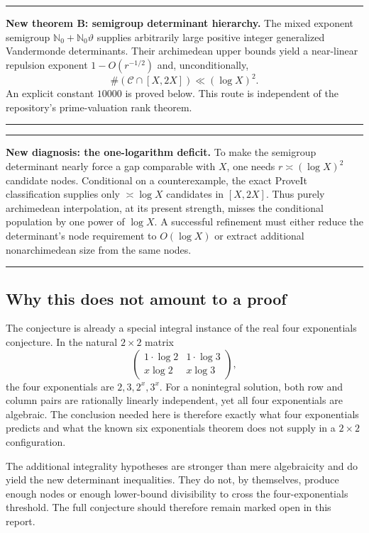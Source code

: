 \documentclass[11pt,oneside]{article}
\theoremstyle{definition}
\theoremstyle{remark}
\newcommand{\Nzero}{\mathbb N_0}
\newcommand{\thetaq}{\vartheta}
\newcommand{\Cand}{\mathcal C}
\newenvironment{resultbox}
{\begin{center}\begin{minipage}{0.94\textwidth}\hrule\vspace{0.45em}}
{\vspace{0.35em}\hrule\end{minipage}\end{center}}
\begin{document}
\begin{resultbox}
\textbf{New theorem B: semigroup determinant hierarchy.}
The mixed exponent semigroup $\Nzero+\Nzero\thetaq$ supplies arbitrarily large positive
integer generalized Vandermonde determinants.  Their archimedean upper bounds yield a
near-linear repulsion exponent $1-O(r^{-1/2})$ and, unconditionally,
\[
 \#(\Cand\cap[X,2X])\ll(\log X)^2.
\]
An explicit constant $10000$ is proved below.  This route is independent of the repository's
prime-valuation rank theorem.
\end{resultbox}

\begin{resultbox}
\textbf{New diagnosis: the one-logarithm deficit.}
To make the semigroup determinant nearly force a gap comparable with $X$, one needs
$r\asymp(\log X)^2$ candidate nodes.  Conditional on a counterexample, the exact ProveIt
classification supplies only $\asymp\log X$ candidates in $[X,2X]$.  Thus purely
archimedean interpolation, at its present strength, misses the conditional population by one
power of $\log X$.  A successful refinement must either reduce the determinant's node
requirement to $O(\!\log X)$ or extract additional nonarchimedean size from the same nodes.
\end{resultbox}

\subsection{Why this does not amount to a proof}

The conjecture is already a special integral instance of the real four exponentials
conjecture.  In the natural $2\times2$ matrix
\[
 \begin{pmatrix}
  1\cdot\log2 & 1\cdot\log3\\
  x\log2 & x\log3
 \end{pmatrix},
\]
the four exponentials are $2,3,2^x,3^x$.  For a nonintegral solution, both row and column
pairs are rationally linearly independent, yet all four exponentials are algebraic.  The
conclusion needed here is therefore exactly what four exponentials predicts and what the
known six exponentials theorem does not supply in a $2\times2$ configuration.

The additional integrality hypotheses are stronger than mere algebraicity and do yield the
new determinant inequalities.  They do not, by themselves, produce enough nodes or enough
lower-bound divisibility to cross the four-exponentials threshold.  The full conjecture should
therefore remain marked open in this report.
\end{document}
